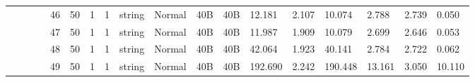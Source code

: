 \begin{landscape}
\begin{table}[]
{\begin{tabular}{@{}ccccllllllllllllll@{}}
                                                                                   &                              &                                &                                                                                                          & 46                                                    & 50                                       & 1                                          & 1                                 & string                           & Normal                             & 40B                                           & 40B                                             & 12.181                  & 2.107    & 10.074                       & 2.788                   & 2.739    & 0.050                        \\
                                                                                   &                              &                                &                                                                                                          & 47                                                    & 50                                       & 1                                          & 1                                 & string                           & Normal                             & 40B                                           & 40B                                             & 11.987                  & 1.909    & 10.079                       & 2.699                   & 2.646    & 0.053                        \\
                                                                                   &                              &                                &                                                                                                          & 48                                                    & 50                                       & 1                                          & 1                                 & string                           & Normal                             & 40B                                           & 40B                                             & 42.064                  & 1.923    & 40.141                       & 2.784                   & 2.722    & 0.062                        \\
                                                                                   &                              &                                &                                                                                                          & 49                                                    & 50                                       & 1                                          & 1                                 & string                           & Normal                             & 40B                                           & 40B                                             & 192.690                 & 2.242    & 190.448                      & 13.161                  & 3.050    & 10.110                       \\

\end{tabular}}
\end{table}
\end{landscape}

